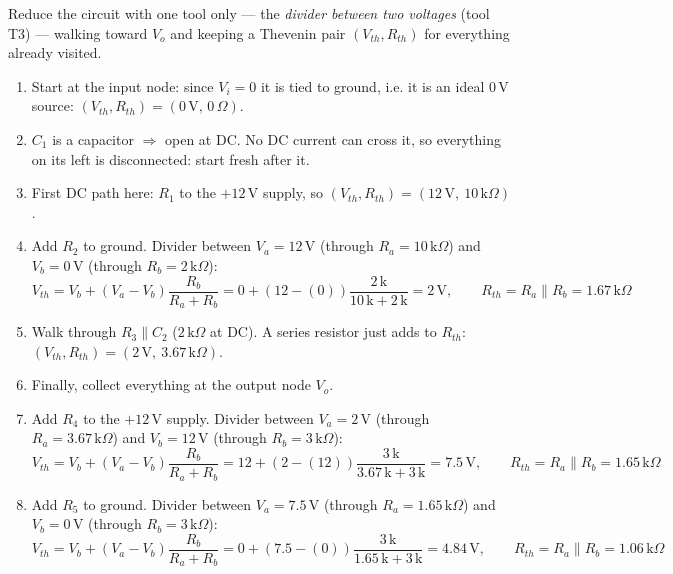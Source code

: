\documentclass[11pt]{article}
\begin{document}
Reduce the circuit with one tool only --- the \emph{divider between two voltages} (tool T3) --- walking toward $V_o$ and keeping a Thevenin pair $(V_{th},R_{th})$ for everything already visited.
\begin{enumerate}[leftmargin=*,itemsep=2pt]
\item Start at the input node: since $V_i=0$ it is tied to ground, i.e. it is an ideal $0\,\mathrm{V}$ source: $(V_{th},R_{th})=(0\,\mathrm{V},\,0\,\Omega)$.
\item $C_{1}$ is a capacitor $\Rightarrow$ open at DC. No DC current can cross it, so everything on its left is disconnected: start fresh after it.
\item First DC path here: $R_{1}$ to the $+12\,\mathrm{V}$ supply, so $(V_{th},R_{th}) = (12\,\mathrm{V},\ 10\,\mathrm{k}\Omega)$.
\item Add $R_{2}$ to ground. Divider between $V_a=12\,\mathrm{V}$ (through $R_a=10\,\mathrm{k}\Omega$) and $V_b=0\,\mathrm{V}$ (through $R_b=2\,\mathrm{k}\Omega$):\[
V_{th} = V_b + (V_a-V_b)\frac{R_b}{R_a+R_b} = 0 + \left(12 - (0)\right)\frac{2\,\mathrm{k}}{10\,\mathrm{k} + 2\,\mathrm{k}} = 2\,\mathrm{V},\qquad R_{th} = R_a\parallel R_b = 1.67\,\mathrm{k}\Omega
\]

\item Walk through $R_{3} \parallel C_{2}$ ($2\,\mathrm{k}\Omega$ at DC). A series resistor just adds to $R_{th}$: $(V_{th},R_{th}) = (2\,\mathrm{V},\ 3.67\,\mathrm{k}\Omega)$.
\item Finally, collect everything at the output node $V_o$.
\item Add $R_{4}$ to the $+12\,\mathrm{V}$ supply. Divider between $V_a=2\,\mathrm{V}$ (through $R_a=3.67\,\mathrm{k}\Omega$) and $V_b=12\,\mathrm{V}$ (through $R_b=3\,\mathrm{k}\Omega$):\[
V_{th} = V_b + (V_a-V_b)\frac{R_b}{R_a+R_b} = 12 + \left(2 - (12)\right)\frac{3\,\mathrm{k}}{3.67\,\mathrm{k} + 3\,\mathrm{k}} = 7.5\,\mathrm{V},\qquad R_{th} = R_a\parallel R_b = 1.65\,\mathrm{k}\Omega
\]

\item Add $R_{5}$ to ground. Divider between $V_a=7.5\,\mathrm{V}$ (through $R_a=1.65\,\mathrm{k}\Omega$) and $V_b=0\,\mathrm{V}$ (through $R_b=3\,\mathrm{k}\Omega$):\[
V_{th} = V_b + (V_a-V_b)\frac{R_b}{R_a+R_b} = 0 + \left(7.5 - (0)\right)\frac{3\,\mathrm{k}}{1.65\,\mathrm{k} + 3\,\mathrm{k}} = 4.84\,\mathrm{V},\qquad R_{th} = R_a\parallel R_b = 1.06\,\mathrm{k}\Omega
\]

\end{enumerate}
\end{document}
